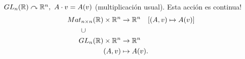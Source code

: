 \begin{eg}
	$GL_n(\mathbb{R}) \curvearrowright \mathbb{R}^n,\ A \cdot v = A(v)$ (multiplicación usual). Esta acción es continua!
	\begin{align*}
		Mat_{n \times n}(\mathbb{R}) \times \mathbb{R}^n & \to \mathbb{R}^n \quad [(A,v) \mapsto A(v)]\\
		\cup \quad \qquad \qquad & \\
		GL_n(\mathbb{R}) \times \mathbb{R}^n & \to \mathbb{R}^n \\
		(A,v) & \mapsto A(v)
	.\end{align*}
\end{eg}
